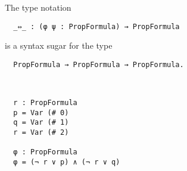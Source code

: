 \documentclass[../main.tex]{subfiles}
\begin{document}
\begin{myremark}
The type notation
\begin{verbatim}
  _⇔_ : (φ ψ : PropFormula) → PropFormula
\end{verbatim}
is a syntax sugar for the type
\begin{verbatim}
  PropFormula → PropFormula → PropFormula.
\end{verbatim}
\end{myremark}

\begin{myexample}
\hspace*{5cm}\\[3mm]
\begin{verbatim}
  r : PropFormula
  p = Var (# 0)
  q = Var (# 1)
  r = Var (# 2)

  φ : PropFormula
  φ = (¬ r ∨ p) ∧ (¬ r ∨ q)
\end{verbatim}
\end{myexample}
\end{document}
